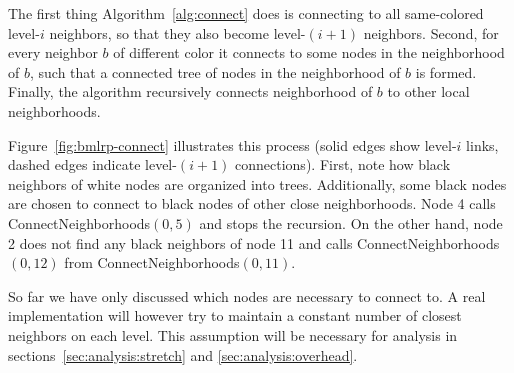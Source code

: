 \documentclass[conference]{IEEEtran}
\theoremstyle{definition}
\begin{document}
The first thing Algorithm~\ref{alg:connect} does is connecting to all same-colored level-$i$ neighbors, so that they also become level-$(i+1)$ neighbors. Second, for every neighbor $b$ of different color it connects to some nodes in the neighborhood of $b$, such that a connected tree of nodes in the neighborhood of $b$ is formed. Finally, the algorithm recursively connects neighborhood of $b$ to other local neighborhoods.

Figure~\ref{fig:bmlrp-connect} illustrates this process (solid edges show level-$i$ links, dashed edges indicate level-$(i+1)$ connections). First, note how black neighbors of white nodes are organized into trees. Additionally, some black nodes are chosen to connect to black nodes of other close neighborhoods. Node 4 calls ConnectNeighborhoods$(0, 5)$ and stops the recursion. On the other hand, node 2 does not find any black neighbors of node 11 and calls ConnectNeighborhoods$(0, 12)$ from ConnectNeighborhoods$(0, 11)$.



So far we have only discussed which nodes are necessary to connect to. A real implementation will however try to maintain a constant number of closest neighbors on each level. This assumption will be necessary for analysis in sections~\ref{sec:analysis:stretch} and \ref{sec:analysis:overhead}.
\end{document}
